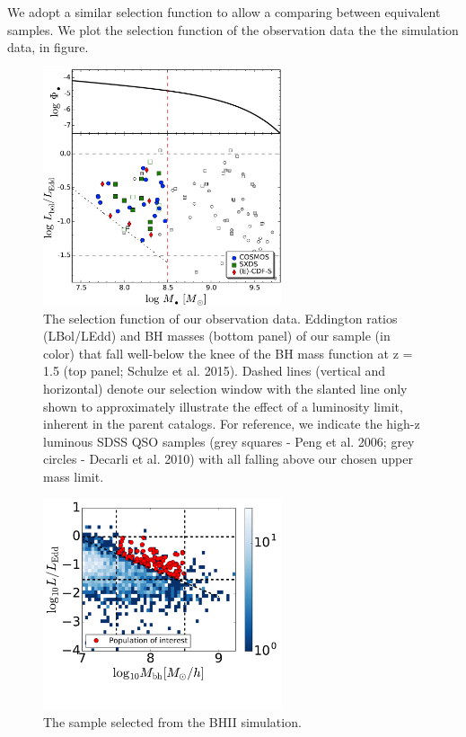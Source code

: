 \documentclass[twocolumn]{aastex62}
\begin{document}
We adopt a similar selection function to allow a comparing between equivalent samples. We plot the selection function of the observation data the the simulation data, in figure.
\begin{figure}[t]
\centering
\includegraphics[width = 7cm]{hst_sample_bhmf_v8.pdf}
\caption{The selection function of our observation data.
Eddington ratios (LBol/LEdd) and BH masses (bottom panel) of our sample (in color) that fall well-below the knee of the BH mass function at z = 1.5 (top panel; Schulze et al. 2015). Dashed lines (vertical and horizontal) denote our selection window with the slanted line only shown to approximately illustrate the effect of a luminosity limit, inherent in the parent catalogs. For reference, we indicate the high-z luminous SDSS QSO samples (grey squares - Peng et al. 2006; grey circles - Decarli et al. 2010) with all falling above our chosen upper mass limit.
}
\label{fig:obs_selectfunc}
\end{figure}

\begin{figure}[t]
\centering
\includegraphics[width = 7cm]{BHII_selectfunc.pdf}
\caption{The sample selected from the BHII simulation.
}
\label{fig:bhII_selectfunc}
\end{figure}
\end{document}
